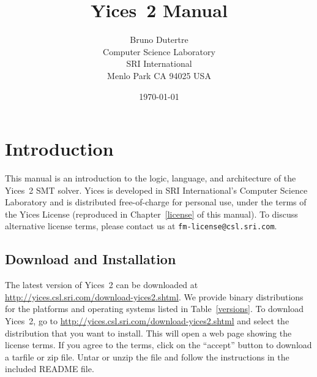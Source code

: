 \documentclass[11pt,twoside,fleqn,openright,titlepage]{cslreport}
\begin{document}
\begin{titlepage}
\date{\today}
\author{Bruno Dutertre\\
Computer Science Laboratory\\
SRI International\\
Menlo Park CA 94025 USA
}
\title{\bf Yices~2 Manual}
\end{titlepage}

\maketitle
\cleardoublepageblank
\tableofcontents
\cleardoublepage
\setcounter{page}{0}


\chapter{Introduction}

This  manual   is  an  introduction   to  the  logic,   language,  and
architecture  of the  Yices~2 SMT  solver. Yices  is developed  in SRI
International's  Computer   Science  Laboratory  and   is  distributed
free-of-charge for personal use, under  the terms of the Yices License
(reproduced  in  Chapter~\ref{license} of  this  manual).  To  discuss
alternative     license     terms,     please    contact     us     at
\texttt{fm-license@csl.sri.com}.

\section{Download and Installation}

The    latest   version    of   Yices~2    can   be    downloaded   at
\url{http://yices.csl.sri.com/download-yices2.shtml}.     We   provide
binary distributions for the platforms and operating systems listed in
Table~\ref{versions}.      To     download     Yices~2,      go     to
\url{http://yices.csl.sri.com/download-yices2.shtml}  and  select  the
distribution  that you  want to  install. This  will open  a  web page
showing the  license terms. If  you agree to  the terms, click  on the
``accept'' button to  download a tarfile or zip  file.  Untar or unzip
the file and follow the instructions in the included README file.
\end{document}
